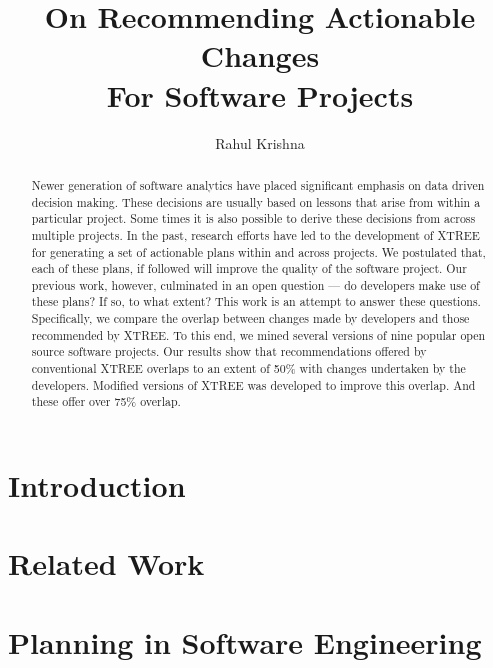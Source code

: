 \documentclass[sigconf, proceedings, 9pt]{acmart}
\begin{document}
\title{On Recommending Actionable Changes\\For Software Projects}
\author{Rahul Krishna}
\acmPrice{}

\begin{abstract}
Newer generation of software analytics have placed significant emphasis on data 
driven decision making. These decisions are usually based on 
lessons that arise from within a particular project. Some times it is also 
possible to derive these decisions from across multiple projects. In the past, 
research efforts have led to the development of XTREE 
for generating a set of actionable plans within and across projects. We 
postulated that, each of these plans, if followed will improve the quality of 
the software project. Our previous work, however, culminated in an open 
question --- do developers make use of these plans? If so, to what extent?
This work is an attempt to answer these questions. Specifically, we compare the 
overlap between changes made by developers and those recommended by XTREE. To 
this end, we mined several versions of nine popular open source software 
projects. Our results show that recommendations offered by conventional XTREE 
overlaps to an extent of 50\% with changes undertaken by the developers. 
Modified versions of XTREE was developed to improve this overlap. And these 
offer over 75\% overlap.

\end{abstract}

\maketitle

\section{Introduction}
\label{sect:intro}

\section{Related Work}
\label{sect:related}

\section{Planning in Software Engineering}
\label{sect:planning}
\end{document}
